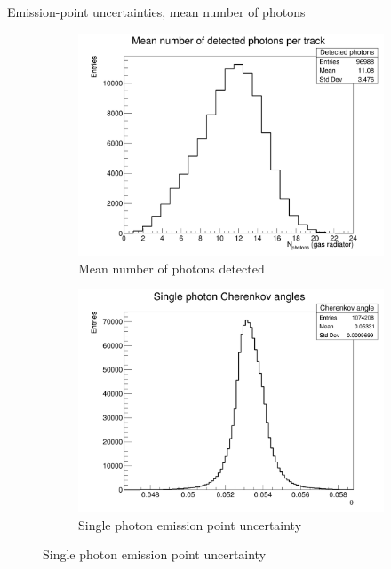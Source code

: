 \documentclass{beamer}
\begin{document}
\begin{frame}{Emission-point uncertainties, mean number of photons}
  \begin{figure}
    \centering
    \vspace{-0.2cm}
    \begin{subfigure}{0.35\textwidth}
      \includegraphics[width = 1.0\textwidth]{Plots/NumberDetectedPhotons.png}
      \caption{Mean number of photons detected}
    \end{subfigure}
    \begin{subfigure}{0.35\textwidth}
      \includegraphics[width = 1.0\textwidth]{Plots/SinglePhotonCherenkovAngles.png}
      \caption{Single photon emission point uncertainty}
    \end{subfigure}%

\end{figure}
\end{frame}
\end{document}
